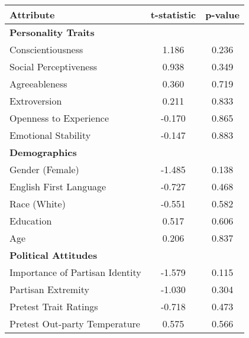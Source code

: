 \begin{tabular}{lcc}
\hline
Attribute & t-statistic & p-value \\
\hline
\multicolumn{3}{l}{\textbf{Personality Traits}} \\
 Conscientiousness & 1.186 & 0.236 \\
 Social Perceptiveness & 0.938 & 0.349 \\
 Agreeableness & 0.360 & 0.719 \\
 Extroversion & 0.211 & 0.833 \\
 Openness to Experience & -0.170 & 0.865 \\
 Emotional Stability & -0.147 & 0.883 \\
\hline
\multicolumn{3}{l}{\textbf{Demographics}} \\
 Gender (Female) & -1.485 & 0.138 \\
 English First Language & -0.727 & 0.468 \\
 Race (White) & -0.551 & 0.582 \\
 Education & 0.517 & 0.606 \\
 Age & 0.206 & 0.837 \\
\hline
\multicolumn{3}{l}{\textbf{Political Attitudes}} \\
 Importance of Partisan Identity & -1.579 & 0.115 \\
 Partisan Extremity & -1.030 & 0.304 \\
 Pretest Trait Ratings & -0.718 & 0.473 \\
 Pretest Out-party Temperature & 0.575 & 0.566 \\
\hline
\end{tabular}